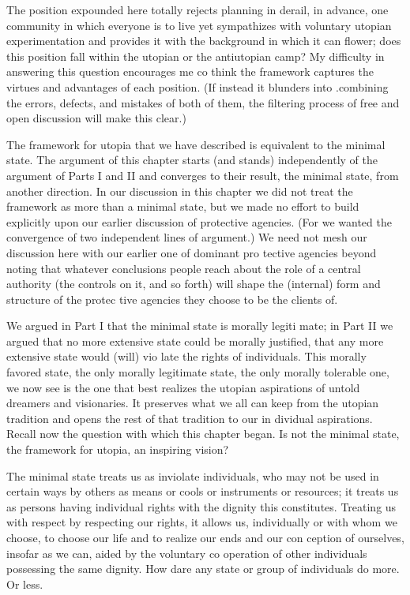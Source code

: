 \documentclass[11pt,openany]{book}
\begin{document}
The position expounded here totally rejects planning in derail, in advance, one community in which everyone is to live yet sympathizes with voluntary utopian experimentation and provides it with the background in which it can flower; does this position fall within the utopian or the antiutopian camp? My difficulty in answering this question encourages me co think the framework captures the virtues and advantages of each position. (If instead it blunders into .combining the errors, defects, and mistakes of both of them, the filtering process of free and open discussion will make this clear.) 

The framework for utopia that we have described is equivalent to the minimal state. The argument of this chapter starts (and stands) independently of the argument of Parts I and II and converges to their result, the minimal state, from another direction. In our discussion in this chapter we did not treat the framework as more than a minimal state, but we made no effort to build explicitly upon our earlier discussion of protective agencies. (For we wanted the convergence of two independent lines of argument.) We need not mesh our discussion here with our earlier one of dominant pro tective agencies beyond noting that whatever conclusions people reach about the role of a central authority (the controls on it, and so forth) will shape the (internal) form and structure of the protec tive agencies they choose to be the clients of. 

We argued in Part I that the minimal state is morally legiti mate; in Part II we argued that no more extensive state could be morally justified, that any more extensive state would (will) vio late the rights of individuals. This morally favored state, the only morally legitimate state, the only morally tolerable one, we now see is the one that best realizes the utopian aspirations of untold dreamers and visionaries. It preserves what we all can keep from the utopian tradition and opens the rest of that tradition to our in dividual aspirations. Recall now the question with which this chapter began. Is not the minimal state, the framework for utopia, an inspiring vision? 

The minimal state treats us as inviolate individuals, who may not be used in certain ways by others as means or cools or instruments or resources; it treats us as persons having individual rights with the dignity this constitutes. Treating us with respect by respecting our rights, it allows us, individually or with whom we choose, to choose our life and to realize our ends and our con ception of ourselves, insofar as we can, aided by the voluntary co operation of other individuals possessing the same dignity. How dare any state or group of individuals do more. Or less. 
\end{document}
